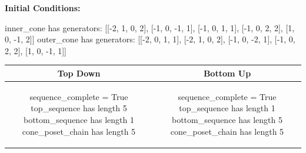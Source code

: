 \documentclass[10pt]{article}
\begin{document}
\textbf{Initial Conditions:}
\begin{SAGE}
inner_cone has generators: 
[[-2, 1, 0, 2], [-1, 0, -1, 1], [-1, 0, 1, 1], [-1, 0, 2, 2], [1, 0, -1, 2]]
outer_cone has generators: 
[[-2, 0, 1, 1], [-2, 1, 0, 2], [-1, 0, -2, 1], [-1, 0, 2, 2], [1, 0, -1, 1]]

\end{SAGE}
\begin{tabular}{c|c}
\textbf{Top Down} & \textbf{Bottom Up} \\ \hline  
\begin{SAGE}
sequence_complete = True
top_sequence has length 5
bottom_sequence has length 1
cone_poset_chain has length 5
\end{SAGE} 
&
\begin{SAGE}
sequence_complete = True
top_sequence has length 1
bottom_sequence has length 5
cone_poset_chain has length 5
\end{SAGE} 
\\ \hline


\end{tabular}
\end{document}
